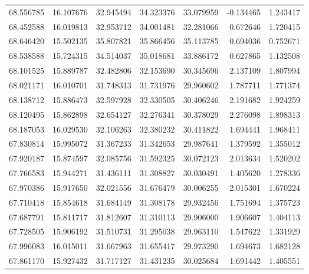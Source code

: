 \begin{tabular}{rrrrrrr}
 68.556785 &  16.107676 &         32.945494 &         34.323376 &         33.079959 & -0.134465 &  1.243417 \\
 68.452588 &  16.019813 &         32.953712 &         34.001481 &         32.281066 &  0.672646 &  1.720415 \\
 68.646420 &  15.502135 &         35.807821 &         35.866456 &         35.113785 &  0.694036 &  0.752671 \\
 68.538588 &  15.724315 &         34.514037 &         35.018681 &         33.886172 &  0.627865 &  1.132508 \\
 68.101525 &  15.889787 &         32.482806 &         32.153690 &         30.345696 &  2.137109 &  1.807994 \\
 68.021171 &  16.010701 &         31.748313 &         31.731976 &         29.960602 &  1.787711 &  1.771374 \\
 68.138712 &  15.886473 &         32.597928 &         32.330505 &         30.406246 &  2.191682 &  1.924259 \\
 68.120495 &  15.862898 &         32.654127 &         32.276341 &         30.378029 &  2.276098 &  1.898313 \\
 68.187053 &  16.029530 &         32.106263 &         32.380232 &         30.411822 &  1.694441 &  1.968411 \\
 67.830814 &  15.995072 &         31.367233 &         31.342653 &         29.987641 &  1.379592 &  1.355012 \\
 67.920187 &  15.874597 &         32.085756 &         31.592325 &         30.072123 &  2.013634 &  1.520202 \\
 67.766583 &  15.944271 &         31.436111 &         31.308827 &         30.030491 &  1.405620 &  1.278336 \\
 67.970386 &  15.917650 &         32.021556 &         31.676479 &         30.006255 &  2.015301 &  1.670224 \\
 67.710418 &  15.854618 &         31.684149 &         31.308178 &         29.932456 &  1.751694 &  1.375723 \\
 67.687791 &  15.811717 &         31.812607 &         31.310113 &         29.906000 &  1.906607 &  1.404113 \\
 67.728505 &  15.906192 &         31.510731 &         31.295038 &         29.963110 &  1.547622 &  1.331929 \\
 67.996083 &  16.015011 &         31.667963 &         31.655417 &         29.973290 &  1.694673 &  1.682128 \\
 67.861170 &  15.927432 &         31.717127 &         31.431235 &         30.025684 &  1.691442 &  1.405551 \\

\end{tabular}
